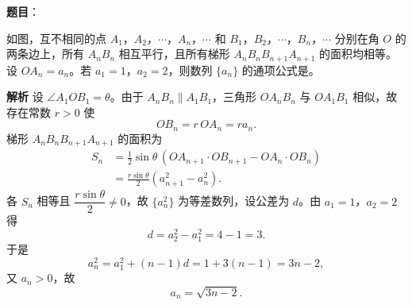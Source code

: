 \begin{answer}

\textbf{题目}：

如图，互不相同的点 $A_1$，$A_2$，$\cdots$，$A_n$，$\cdots$ 和 $B_1$，$B_2$，$\cdots$，$B_n$，$\cdots$ 分别在角 $O$ 的两条边上，所有 $A_nB_n$ 相互平行，且所有梯形 $A_nB_nB_{n+1}A_{n+1}$ 的面积均相等。设 $OA_n=a_n$。若 $a_1=1$，$a_2=2$，则数列 $\{a_n\}$ 的通项公式是\gkblank{}。
\nopagebreak[4]
\begin{center}\end{center}
\nopagebreak[4]
\textbf{解析}
设 $\angle A_1OB_1=\theta$。由于 $A_nB_n\parallel A_1B_1$，三角形 $OA_nB_n$ 与 $OA_1B_1$ 相似，故存在常数 $r>0$ 使
\nopagebreak[4]
\[OB_n=r\,OA_n=r a_n.\]
梯形 $A_nB_nB_{n+1}A_{n+1}$ 的面积为
\nopagebreak[4]
\[\begin{aligned}
S_n&=\frac12\sin\theta\,(OA_{n+1}\cdot OB_{n+1}-OA_n\cdot OB_n)\\
&=\frac{r\sin\theta}{2}\left(a_{n+1}^2-a_n^2\right).
\end{aligned}\]
各 $S_n$ 相等且 $\dfrac{r\sin\theta}{2}\neq0$，故 $\{a_n^2\}$ 为等差数列，设公差为 $d$。由 $a_1=1$，$a_2=2$ 得
\nopagebreak[4]
\[d=a_2^2-a_1^2=4-1=3.\]
于是
\nopagebreak[4]
\[a_n^2=a_1^2+(n-1)d=1+3(n-1)=3n-2,\]
又 $a_n>0$，故
\nopagebreak[4]
\[a_n=\sqrt{3n-2}.\]


\end{answer}
